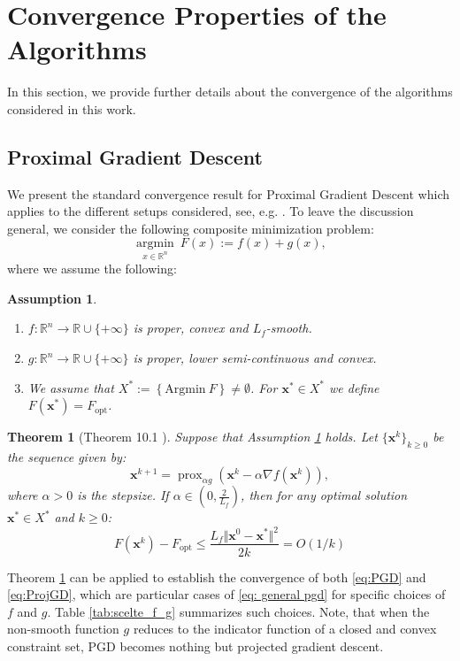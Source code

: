 \documentclass[letterpaper]{article}
\newcommand{\x}{\mathbf{x}}
\newtheorem{theorem}{Theorem}
\newtheorem{assumption}{Assumption}
\begin{document}
\section{Convergence Properties of the Algorithms}
\label{app: app_conv}

In this section, we provide further details about the convergence of the algorithms considered in this work. 

\subsection{Proximal Gradient Descent}

We present the standard convergence result for Proximal Gradient Descent which applies to the different setups considered, see, e.g. \cite{beck}. To leave the discussion general, we consider the following composite minimization problem:
\begin{equation}
    \underset{x \in \mathbb{R}^n}{\operatorname{argmin}}~ F(x) := f(x) + g(x), \label{eq: composite problem F = f+g}
\end{equation}
where we assume the following:
\begin{assumption} \label{assumption 1} \leavevmode
    \begin{enumerate}
        \item $f : \mathbb{R}^n \to \mathbb{R} \cup \{+ \infty\}$ is proper, convex and $L_{f}$-smooth.
        \item $g : \mathbb{R}^n \to \mathbb{R} \cup \{+ \infty\}$ is proper, lower semi-continuous and convex.
        \item We assume that  $X^*:=\left\{ \text{Argmin}~F\right\} \neq \emptyset$. For $\x^*\in X^*$ we define $F(\x^*)=F_{\text{opt}}$.   
    \end{enumerate}
\end{assumption}

\begin{theorem}[Theorem 10.1 \cite{beck}]
\label{converg_pgd}
Suppose that Assumption \ref{assumption 1} holds. Let $\{  \mathbf{x}^k \}_{k \geq 0}$ be the sequence given by:
\begin{equation}
    \mathbf{x}^{k+1} = \operatorname{prox}_{\alpha g} (\mathbf{x}^k - \alpha \nabla f(\mathbf{x}^k)), \label{eq: general pgd}
\end{equation}
where $\alpha > 0$ is the stepsize.
     If $\alpha \in \left(0, \frac{2}{L_f}\right) $, then for any optimal solution \( \x^* \in X^* \) and \( k \geq 0 \):
    $$F(\x^k) - F_{\text{opt}} \leq \frac{L_f \Vert \x^0 - \x^* \Vert^2}{2k} = O(1/k)$$
\end{theorem}
Theorem \ref{converg_pgd} can be applied to establish the convergence of both \eqref{eq:PGD} and \eqref{eq:ProjGD}, which are particular cases of \eqref{eq: general pgd} for specific choices of $f$ and $g$. Table \ref{tab:scelte_f_g} summarizes such choices. Note, that when the non-smooth function $g$ reduces to the indicator function of a closed and convex constraint set, PGD becomes nothing but projected gradient descent.
\end{document}
